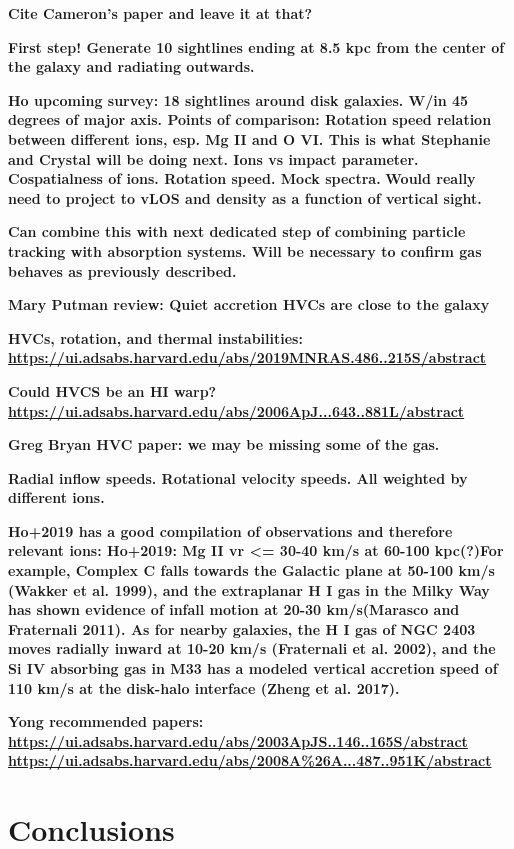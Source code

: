 \documentclass[fleqn,usenatbib]{mnras}
\begin{document}
\textbf{
Cite Cameron's paper and leave it at that?
}

\textbf{
First step!
Generate 10 sightlines ending at 8.5 kpc from the center of the galaxy and radiating outwards.
}

\textbf{
Ho upcoming survey:
18 sightlines around disk galaxies.
W/in 45 degrees of major axis.
Points of comparison:
Rotation speed relation between different ions, esp. Mg II and O VI. This is what Stephanie and Crystal will be doing next.
Ions vs impact parameter.
Cospatialness of ions.
Rotation speed.
Mock spectra.
}
\textbf{
Would really need to project to vLOS and density as a function of vertical sight.
}

\textbf{
Can combine this with next dedicated step of combining particle tracking with absorption systems.
Will be necessary to confirm gas behaves as previously described.
}

\textbf{Mary Putman review:
Quiet accretion
HVCs are close to the galaxy}

\textbf{HVCs, rotation, and thermal instabilities:
\url{https://ui.adsabs.harvard.edu/abs/2019MNRAS.486..215S/abstract}
}

\textbf{
Could HVCS be an HI warp?
\url{https://ui.adsabs.harvard.edu/abs/2006ApJ...643..881L/abstract}
}

\textbf{
Greg Bryan HVC paper:
we may be missing some of the gas.
}

\textbf{
Radial inflow speeds.
Rotational velocity speeds.
All weighted by different ions.
}

\textbf{
Ho+2019 has a good compilation of observations and therefore relevant ions:
Ho+2019:
Mg II vr <= 30-40 km/s at 60-100 kpc(?)For example, Complex C falls towards the Galactic plane at 50-100 km/s (Wakker et al. 1999), and the extraplanar H I gas in the Milky Way has shown evidence of infall motion at 20-30 km/s(Marasco and Fraternali 2011).
As for nearby galaxies, the H I gas of NGC 2403 moves radially inward at 10-20 km/s (Fraternali et al. 2002), and the Si IV absorbing gas in M33 has a modeled vertical accretion speed of 110 km/s at the disk-halo interface (Zheng et al. 2017).
}

\textbf{
Yong recommended papers:
\url{https://ui.adsabs.harvard.edu/abs/2003ApJS..146..165S/abstract}
\url{https://ui.adsabs.harvard.edu/abs/2008A\%26A...487..951K/abstract}
}

\section{Conclusions}
\label{s: conclusions}
\end{document}
